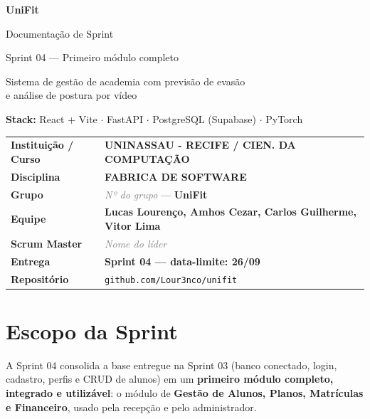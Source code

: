 \documentclass[11pt,a4paper,final]{article}
\newcommand{\cod}[1]{\texttt{#1}}
\newcommand{\preencher}[1]{\textit{\textcolor{gray}{#1}}}
\begin{document}
\begin{titlepage}
  \centering
  \vspace*{3cm}
  {\Huge\bfseries\color{azul} UniFit\par}
  \vspace{0.6cm}
  {\LARGE Documentação de Sprint\par}
  \vspace{0.3cm}
  {\Large Sprint 04 --- Primeiro módulo completo\par}
  \vspace{1.2cm}
  {\large Sistema de gestão de academia com previsão de evasão\\
  e análise de postura por vídeo\par}
  \vspace{0.8cm}
  {\small\textbf{Stack:} React + Vite $\cdot$ FastAPI $\cdot$ PostgreSQL (Supabase) $\cdot$ PyTorch\par}
  \vfill
  \begin{tabular}{>{\bfseries}l l}
    \toprule
    Instituição / Curso & \textbf{UNINASSAU - RECIFE / CIEN. DA COMPUTAÇÃO} \\
    Disciplina          & \textbf{FABRICA DE SOFTWARE} \\
    Grupo               & \preencher{Nº do grupo} --- \textbf{UniFit} \\
    Equipe              & \textbf{Lucas Lourenço, Amhos Cezar, Carlos Guilherme, Vitor Lima} \\
    Scrum Master        & \preencher{Nome do líder} \\
    Entrega             & \textbf{Sprint 04 --- data-limite: 26/09} \\
    Repositório         & \cod{github.com/Lour3nco/unifit} \\
    \bottomrule
  \end{tabular}
  \vspace{1.5cm}
\end{titlepage}

\tableofcontents
\newpage

\section{Escopo da Sprint}

A Sprint 04 consolida a base entregue na Sprint 03 (banco conectado, login, cadastro, perfis e CRUD de
alunos) em um \textbf{primeiro módulo completo, integrado e utilizável}: o módulo de
\textbf{Gestão de Alunos, Planos, Matrículas e Financeiro}, usado pela recepção e pelo administrador.
\end{document}
